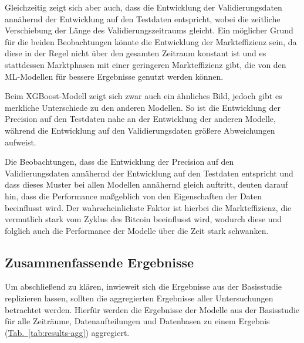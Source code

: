 \documentclass[a4paper, 12pt]{article}
\begin{document}



Gleichzeitig zeigt sich aber auch, dass die Entwicklung der Validierungsdaten annähernd der Entwicklung auf den Testdaten entspricht, wobei die zeitliche Verschiebung der Länge des Validierungszeitraums gleicht.
Ein möglicher Grund für die beiden Beobachtungen könnte die Entwicklung der Markteffizienz sein, da diese in der Regel nicht über den gesamten Zeitraum konstant ist und es stattdessen Marktphasen mit einer geringeren Markteffizienz gibt, die von den ML-Modellen für bessere Ergebnisse genutzt werden können.





Beim XGBoost-Modell zeigt sich zwar auch ein ähnliches Bild, jedoch gibt es merkliche Unterschiede zu den anderen Modellen.
So ist die Entwicklung der Precision auf den Testdaten nahe an der Entwicklung der anderen Modelle, während die Entwicklung auf den Validierungsdaten größere Abweichungen aufweist.

Die Beobachtungen, dass die Entwicklung der Precision auf den Validierungsdaten annähernd der Entwicklung auf den Testdaten entspricht und dass dieses Muster bei allen Modellen annähernd gleich auftritt, deuten darauf hin, dass die Performance maßgeblich von den Eigenschaften der Daten beeinflusst wird.
Der wahrscheinlichste Faktor ist hierbei die Markteffizienz, die vermutlich stark vom Zyklus des Bitcoin beeinflusst wird, wodurch diese und folglich auch die Performance der Modelle über die Zeit stark schwanken.

\subsection{Zusammenfassende Ergebnisse}
Um abschließend zu klären, inwieweit sich die Ergebnisse aus der Basisstudie replizieren lassen, sollten die aggregierten Ergebnisse aller Untersuchungen betrachtet werden.
Hierfür werden die Ergebnisse der Modelle aus der Basisstudie für alle Zeiträume, Datenaufteilungen und Datenbasen zu einem Ergebnis (\hyperref[tab:results-agg]{Tab.~\ref*{tab:results-agg}}) aggregiert.
\end{document}
